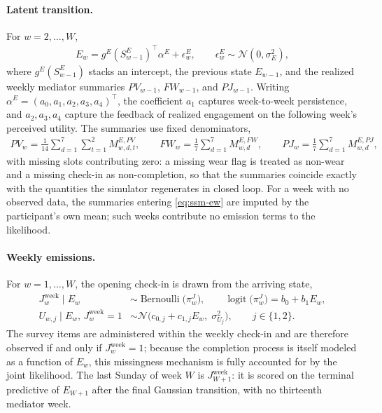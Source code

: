\paragraph{Latent transition.}
For $w = 2, \ldots, W$,
\begin{align}
E_w
=
g^{E}(S_{w-1}^{E})^\top \alpha^{E}
+
\epsilon_w^E,
\qquad
\epsilon_w^E
\sim
\mathcal{N}(0, \sigma_E^2),
\label{eq:ssm-ew}
\end{align}
where $g^{E}(S_{w-1}^{E})$ stacks an intercept, the previous state $E_{w-1}$,
and the realized weekly mediator summaries $PV_{w-1}$, $FW_{w-1}$, and
$PJ_{w-1}$. Writing $\alpha^{E} = (a_0, a_1, a_2, a_3, a_4)^\top$, the
coefficient $a_1$ captures week-to-week persistence, and $a_2, a_3, a_4$
capture the feedback of realized engagement on the following week's perceived
utility. The summaries use fixed denominators,
\begin{align}
PV_w
=
\tfrac{1}{14}
\sum_{d=1}^{7} \sum_{t=1}^{2} M_{w,d,t}^{E,PV},
\qquad
FW_w
=
\tfrac{1}{7}
\sum_{d=1}^{7} M_{w,d}^{E,FW},
\qquad
PJ_w
=
\tfrac{1}{7}
\sum_{d=1}^{7} M_{w,d}^{E,PJ},
\label{eq:pu-weekly-summaries}
\end{align}
with missing slots contributing zero: a missing wear flag is treated as
non-wear and a missing check-in as non-completion, so that the summaries
coincide exactly with the quantities the simulator regenerates in closed loop.
For a week with no observed data, the summaries entering \eqref{eq:ssm-ew} are
imputed by the participant's own mean; such weeks contribute no emission terms
to the likelihood.

\paragraph{Weekly emissions.}
For $w = 1, \ldots, W$, the opening check-in is drawn from the arriving state,
\begin{align}
J_w^{\mathrm{week}} \mid E_w
&\sim
\operatorname{Bernoulli}\!\bigl(\pi_w^{J}\bigr),
\qquad
\operatorname{logit}\bigl(\pi_w^{J}\bigr) = b_0 + b_1 E_w,
\nonumber\\
U_{w,j} \mid E_w,\, J_w^{\mathrm{week}} = 1
&\sim
\mathcal{N}\!\bigl(c_{0,j} + c_{1,j} E_w,\; \sigma_{U_j}^2\bigr),
\qquad j \in \{1, 2\}.
\label{eq:pu-weekly-emissions}
\end{align}
The survey items are administered within the weekly check-in and are therefore
observed if and only if $J_w^{\mathrm{week}} = 1$; because the completion
process is itself modeled as a function of $E_w$, this missingness mechanism is
fully accounted for by the joint likelihood.
The last Sunday of week $W$ is $J_{W+1}^{\mathrm{week}}$: it is scored on the
terminal predictive of $E_{W+1}$ after the final Gaussian transition, with no
thirteenth mediator week.

